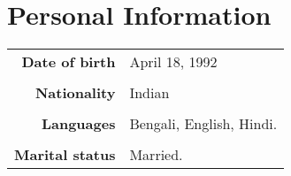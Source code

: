 \documentclass[12pt]{article}
\begin{document}
\section{Personal Information}
\begin{longtable}{rp{14cm}}
{\bfseries Date of birth} & April 18, 1992\\\\
{\bfseries Nationality} & Indian\\\\
{\bfseries Languages} & Bengali, English, Hindi.\\\\
{\bfseries Marital status} & Married.
\end{longtable}
\end{document}
